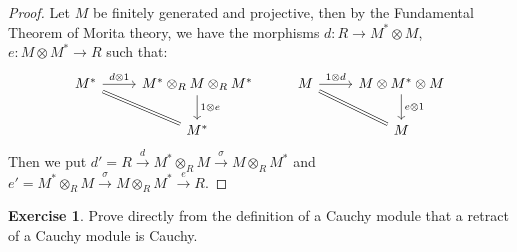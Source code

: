 \documentclass[8pt]{article}
\theoremstyle{definition}
\theoremstyle{definition}
\theoremstyle{definition}
\theoremstyle{definition}
\theoremstyle{definition}
\theoremstyle{definition}
\theoremstyle{definition}
\theoremstyle{definition}
\theoremstyle{definition}
\theoremstyle{definition}
\theoremstyle{definition}
\theoremstyle{definition}
\theoremstyle{definition}
\newtheorem{exercise}{Exercise}[section]
\theoremstyle{definition}
\theoremstyle{question}
\begin{document}
\begin{proof}
Let $M$ be finitely generated and projective, then by the Fundamental Theorem of Morita theory, we have the morphisms
$d : R \to M^* \otimes M$, $e : M \otimes M^* \to R$ such that:
\[
\begin{tikzcd}
M^* \ar[dr, equal] \ar[r, "d \otimes 1"] & M^* \otimes_R M \otimes_R M^* \ar[d, "1 \otimes e"] &  M \ar[dr, equal] \ar[r, "1 \otimes d"] & M \otimes M^* \otimes M \ar[d, "e \otimes 1"] \\
& M^*                                                                                          && M
\end{tikzcd}
\]
Then we put $d' = R \xrightarrow{d} M^* \otimes_R M \xrightarrow{\sigma} M \otimes_R M^*$ and $e' = M^* \otimes_R M \xrightarrow{\sigma} M \otimes_R M^* \xrightarrow{e} R$.
\end{proof}

\begin{exercise}
Prove directly from the definition of a Cauchy module that a retract of a Cauchy module is Cauchy.
\end{exercise}
\end{document}
